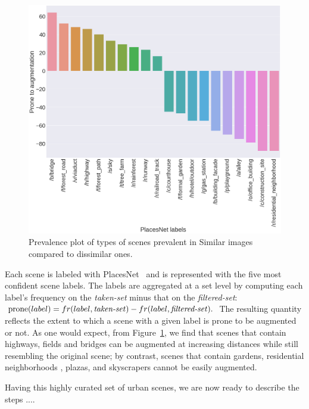 \begin{figure}[ht]
	\centering
	\includegraphics[width=\columnwidth]{Plot/SimilarityPlacesPrevalence.png}
	\caption{Prevalence plot of types of scenes prevalent in Similar images compared to dissimilar ones.}
	\label{fig:augmentationSimilarity}
\end{figure}

Each scene is labeled with PlacesNet~\cite{zhou2014learning} and is represented with the five most confident scene labels. The labels are aggregated  at a set level by computing each label's frequency on the \emph{taken-set} minus that on the \emph{filtered-set}: 
$ \textrm{prone}(label)= fr(label,\textrm{\emph{taken-set}}) - fr(label,\textrm{\emph{filtered-set}}).$
The resulting quantity reflects the extent to which a scene with a given label is prone to be augmented or not. As one would expect, from Figure~\ref{fig:augmentationSimilarity}, we find that scenes that contain highways, fields and bridges can be augmented at increasing distances while still resembling the original scene; by contrast, scenes that contain gardens, residential neighborhoods , plazas, and skyscrapers cannot be easily augmented. 


Having this highly curated set of urban scenes, we are now ready to describe the steps ....




 




